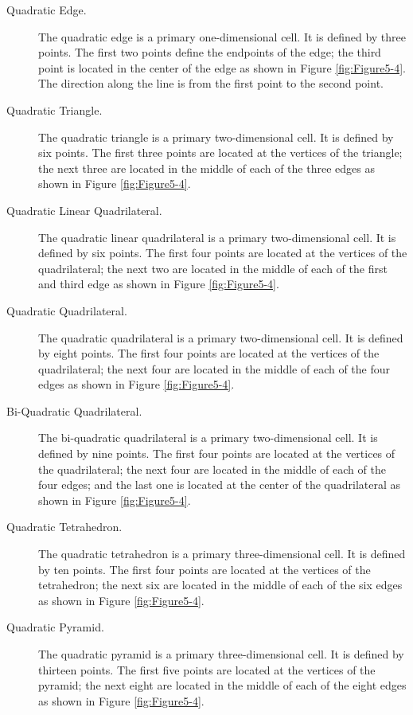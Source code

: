 \begin{description}

\item[Quadratic Edge.] The quadratic edge is a primary one-dimensional cell. It is defined by three points. The first two points define the endpoints of the edge; the third point is located in the center of the edge as shown in Figure \ref{fig:Figure5-4}. The direction along the line is from the first point to the second point.

\item[Quadratic Triangle.] The quadratic triangle is a primary two-dimensional cell. It is defined by six points. The first three points are located at the vertices of the triangle; the next three are located in the middle of each of the three edges as shown in Figure \ref{fig:Figure5-4}.

\item[Quadratic Linear Quadrilateral.] The quadratic linear quadrilateral is a primary two-dimensional cell. It is defined by six points. The first four points are located at the vertices of the quadrilateral; the next two are located in the middle of each of the first and third edge as shown in Figure \ref{fig:Figure5-4}.

\item[Quadratic Quadrilateral.] The quadratic quadrilateral is a primary two-dimensional cell. It is defined by eight points. The first four points are located at the vertices of the quadrilateral; the next four are located in the middle of each of the four edges as shown in Figure \ref{fig:Figure5-4}.

\item[Bi-Quadratic Quadrilateral.] The bi-quadratic quadrilateral is a primary two-dimensional cell. It is defined by nine points. The first four points are located at the vertices of the quadrilateral; the next four are located in the middle of each of the four edges; and the last one is located at the center of the quadrilateral as shown in Figure \ref{fig:Figure5-4}.

\item[Quadratic Tetrahedron.] The quadratic tetrahedron is a primary three-dimensional cell. It is defined by ten points. The first four points are located at the vertices of the tetrahedron; the next six are located in the middle of each of the six edges as shown in Figure \ref{fig:Figure5-4}.

\item[Quadratic Pyramid.] The quadratic pyramid is a primary three-dimensional cell. It is defined by thirteen points. The first five points are located at the vertices of the pyramid; the next eight are located in the middle of each of the eight edges as shown in Figure \ref{fig:Figure5-4}.


\end{description}
